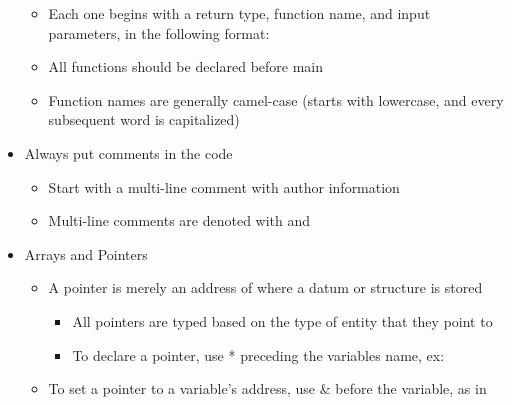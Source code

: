 \begin{itemize}
\begin{itemize}
      \item Each one begins with a return type, function name, and input parameters, in the following format:

        \begin{center}
        \end{center}

      \item All functions should be declared before main

      \item Function names are generally camel-case (starts with lowercase, and every subsequent word is capitalized)

    \end{itemize}

  \item Always put comments in the code

    \begin{itemize}

      \item Start with a multi-line comment with author information
        
      \item Multi-line comments are denoted with \code{/*} and \code{*/}

    \end{itemize}

  \item Arrays and Pointers

    \begin{itemize}

      \item A pointer is merely an address of where a datum or structure is stored

        \begin{itemize}

          \item All pointers are typed based on the type of entity that they point to

          \item To declare a pointer, use * preceding the variables name, ex: 

        \end{itemize}
        
      \item To set a pointer to a variable's address, use \& before the variable, as in 

        \begin{itemize}


\end{itemize}
\end{itemize}
\end{itemize}
